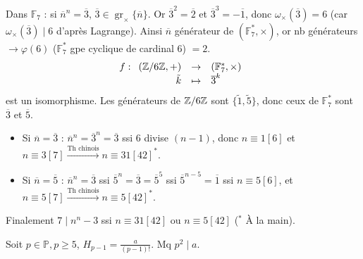 \begin{solution}
Dans $\mathbb{F}_7$ :
si $\overline{n}^n = \overline{3}$, $\overline{3} \in \operatorname{gr}_\times \{\overline{n}\}$. Or $\overline{3}^2 = \overline{2}$ et $\overline{3}^3 = -\overline{1}$, donc $\omega_\times(\overline{3}) = 6$ (car $\omega_\times(\overline{3}) \mid 6$ d'après Lagrange). Ainsi $\overline{n}$ générateur de $(\mathbb{F}_7^*, \times)$, or nb générateurs $\to \varphi(6)$ ($\mathbb{F}_7^*$ gpe cyclique de cardinal $6$) $= 2$.
\[ f : \begin{array}[t]{rcl} (\mathbb Z/6\mathbb Z, +) & \to & (\mathbb{F}_7^*, \times) \\ \tilde{k} & \mapsto & \overline{3}^k \end{array} \]
est un isomorphisme. Les générateurs de $\mathbb Z/6\mathbb Z$ sont $\{\tilde{1}, \tilde{5}\}$, donc ceux de $\mathbb{F}_7^*$ sont $\overline{3}$ et $\overline{5}$.
\begin{itemize}
  \item Si $\overline{n} = \overline{3}$ : $\overline{n}^n = \overline{3}^n = \overline{3}$ ssi $6$ divise $(n-1)$, donc $n \equiv 1 [6]$ et $n \equiv 3 [7] \xrightarrow{\text{Th chinois}} n \equiv 31 [42]^*$.
  \item Si $\overline{n} = \overline{5}$ : $\overline{n}^n = \overline{3}$ ssi $\overline{5}^n = \overline{3} = \overline{5}^5$ ssi $\overline{5}^{n-5} = \overline{1}$ ssi $n \equiv 5 [6]$, et $n \equiv 5 [7] \xrightarrow{\text{Th chinois}} n \equiv 5 [42]^*$.
\end{itemize}
Finalement $7 \mid n^n - 3$ ssi $\boxed{n \equiv 31 [42] \text{ ou } n \equiv 5 [42]}$ ($^*$ À la main).
\end{solution}


\begin{statementbox}
Soit $p \in \mathbb{P}, p \geq 5$, $H_{p-1} = \frac{a}{(p-1)!}$. Mq $p^2 \mid a$.
\end{statementbox}

